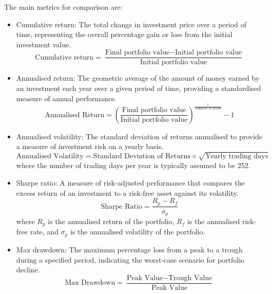The main metrics for comparison are:
\begin{itemize}
    \item Cumulative return: The total change in investment price over a period of time, representing the overall percentage gain or loss from the initial investment value.
    \begin{equation}
        \text{Cumulative return} = \frac{\text{Final portfolio value} - \text{Initial portfolio value}}{\text{Initial portfolio value}}
    \end{equation}
    \item Annualised return: The geometric average of the amount of money earned by an investment each year over a given period of time, providing a standardised measure of annual performance.
    \begin{equation}
        \text{Annualised Return} = \left(\frac{\text{Final portfolio value}}{\text{Initial portfolio value}}\right)^{\frac{1}{\text{Number of years}}} - 1
    \end{equation}
    \item Annualised volatility: The standard deviation of returns annualised to provide a measure of investment risk on a yearly basis.
    \begin{equation}
        \text{Annualised Volatility} = \text{Standard Deviation of Returns} \times \sqrt{\text{Yearly trading days}}
    \end{equation}
    where the number of trading days per year is typically assumed to be 252.
    \item Sharpe ratio: A measure of risk-adjusted performance that compares the excess return of an investment to a risk-free asset against its volatility.
    \begin{equation}
        \text{Sharpe Ratio} = \frac{R_p - R_f}{\sigma_p}
    \end{equation}
    where \(R_p\) is the annualised return of the portfolio, \(R_f\) is the annualised risk-free rate, and \(\sigma_p\) is the annualised volatility of the portfolio.
    \item Max drawdown: The maximum percentage loss from a peak to a trough during a specified period, indicating the worst-case scenario for portfolio decline.
    \begin{equation}
        \text{Max Drawdown} = \frac{\text{Peak Value} - \text{Trough Value}}{\text{Peak Value}}
    \end{equation}
\end{itemize}

